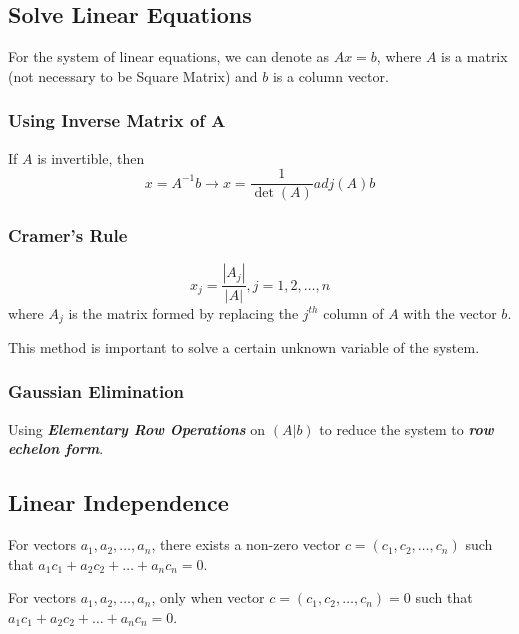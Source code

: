 \subsection{Solve Linear Equations}

For the system of linear equations, we can denote as $Ax=b$, where $A$ is a matrix (not necessary to be Square Matrix) and $b$ is a column vector.

\subsubsection{Using Inverse Matrix of A}
If $A$ is invertible, then \begin{equation*}
    x = A^{-1}b \to x = \frac{1}{\det(A)}adj(A)b
\end{equation*}

\subsubsection{Cramer's Rule}

\begin{equation*}
    x_j = \frac{|A_{j}|}{|A|}, j=1,2,\dots,n
\end{equation*}
where $A_{j}$ is the matrix formed by replacing the $j^{th}$ column of $A$ with the vector $b$.

\begin{remark*}
    This method is important to solve a certain unknown variable of the system.
\end{remark*}

\subsubsection{Gaussian Elimination}

Using \textbf{\textit{Elementary Row Operations}} on $(A|b)$ to reduce the system to \textbf{\textit{row echelon form}}.

\subsection{Linear Independence}

\begin{definition}
    For vectors $a_{1}, a_{2}, \dots, a_{n}$, there exists a non-zero vector $c=(c_{1}, c_{2}, \dots, c_{n})$ such that $a_{1}c_{1} + a_{2}c_{2} + \dots + a_{n}c_{n} = 0$.
\end{definition}

\begin{definition}
    For vectors $a_{1}, a_{2}, \dots, a_{n}$, only when vector $c=(c_{1}, c_{2}, \dots, c_{n}) = 0$ such that $a_{1}c_{1} + a_{2}c_{2} + \dots + a_{n}c_{n} = 0$.
\end{definition}

